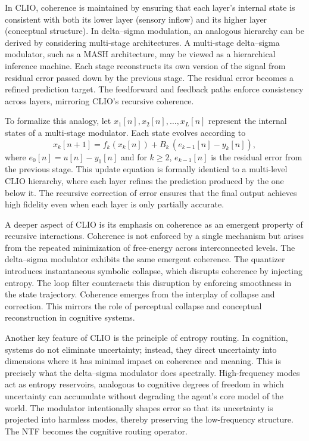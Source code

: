 In CLIO, coherence is maintained by ensuring that each layer's internal state is consistent with both its lower layer (sensory inflow) and its higher layer (conceptual structure). In delta–sigma modulation, an analogous hierarchy can be derived by considering multi-stage architectures. A multi-stage delta–sigma modulator, such as a MASH architecture, may be viewed as a hierarchical inference machine. Each stage reconstructs its own version of the signal from residual error passed down by the previous stage. The residual error becomes a refined prediction target. The feedforward and feedback paths enforce consistency across layers, mirroring CLIO's recursive coherence.

To formalize this analogy, let \(x_{1}[n], x_{2}[n], \ldots, x_{L}[n]\) represent the internal states of a multi-stage modulator. Each state evolves according to
\[
x_{k}[n+1] = f_{k}(x_{k}[n]) + B_{k}\,(e_{k-1}[n] - y_{k}[n]),
\]
where \(e_{0}[n] = u[n] - y_{1}[n]\) and for \(k \ge 2\), \(e_{k-1}[n]\) is the residual error from the previous stage. This update equation is formally identical to a multi-level CLIO hierarchy, where each layer refines the prediction produced by the one below it. The recursive correction of error ensures that the final output achieves high fidelity even when each layer is only partially accurate.

A deeper aspect of CLIO is its emphasis on coherence as an emergent property of recursive interactions. Coherence is not enforced by a single mechanism but arises from the repeated minimization of free-energy across interconnected levels. The delta–sigma modulator exhibits the same emergent coherence. The quantizer introduces instantaneous symbolic collapse, which disrupts coherence by injecting entropy. The loop filter counteracts this disruption by enforcing smoothness in the state trajectory. Coherence emerges from the interplay of collapse and correction. This mirrors the role of perceptual collapse and conceptual reconstruction in cognitive systems.

Another key feature of CLIO is the principle of entropy routing. In cognition, systems do not eliminate uncertainty; instead, they direct uncertainty into dimensions where it has minimal impact on coherence and meaning. This is precisely what the delta–sigma modulator does spectrally. High-frequency modes act as entropy reservoirs, analogous to cognitive degrees of freedom in which uncertainty can accumulate without degrading the agent’s core model of the world. The modulator intentionally shapes error so that its uncertainty is projected into harmless modes, thereby preserving the low-frequency structure. The NTF becomes the cognitive routing operator.

